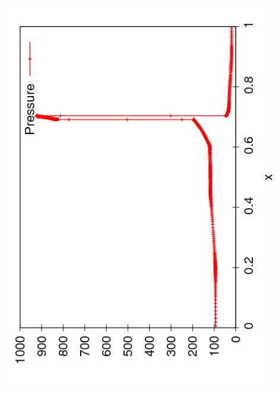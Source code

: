\documentclass{beamer}
\begin{document}
\begin{frame}
\begin{columns}
\begin{column}{0.5\textwidth}
\begin{overlayarea}{\textwidth}{0.9\textheight}
{          \includegraphics[angle=-90,width=0.9\textwidth]{figures/AMR_Pressure_250}
        }
        {
}
\end{overlayarea}
\end{column}
\end{columns}
\end{frame}
\end{document}
